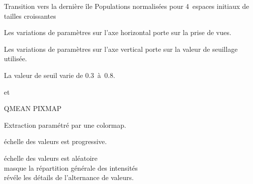 
\begin{slide}
  {Transition vers la derni\`ere \^ile}%
  {Populations normalis\'ees pour 4~espaces initiaux de tailles crois\-santes}%
\end{slide}


{}
{}

\begin{slide}
  { }
\end{slide}

\begin{mynote}
  Les variations de param\`etres sur l'axe horizontal porte sur la prise
  de vues.
  
  Les variations de param\`etres sur l'axe vertical porte sur la valeur
  de seuillage utilis\'ee.
  
  La valeur de seuil varie de 0.3~\`a~0.8.
\end{mynote}

\begin{slide}
  {}
  {}
\end{slide}

{%
  {   et }}
{%
  QMEAN PIXMAP

  Extraction param\'etr\'e par une colormap.

  \'echelle  des  valeurs est progressive.

  \'echelle des  valeurs est al\'eatoire\\
  masque la r\'epartition g\'en\'erale des intensit\'es\\
  r\'ev\'ele les d\'etails de l'alternance de valeurs.}

